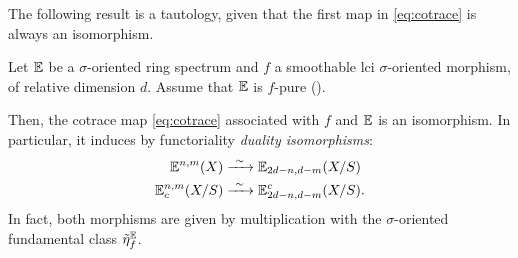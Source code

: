 The following result is a tautology, given that the first map
 in \eqref{eq:cotrace} is always an isomorphism.
\begin{prop}
Let $\mathbb E$ be  a $\sigma$-oriented ring spectrum
 and $f$ a smoothable lci $\sigma$-oriented morphism, of relative dimension $d$.
 Assume that $\mathbb E$ is $f$-pure ().

Then, the cotrace map \eqref{eq:cotrace} associated with $f$ and $\mathbb E$ is an isomorphism.
In particular, it induces by functoriality \emph{duality isomorphisms}:
\begin{align*}
\mathbb E^{n,m}(X) &\xrightarrow{\ \sim\ } \mathbb E_{2d-n,d-m}(X/S) \\
\mathbb E^{n,m}_c(X/S) &\xrightarrow{\ \sim\ } \mathbb E^c_{2d-n,d-m}(X/S).
\end{align*}
In fact, both morphisms are given by multiplication with the $\sigma$-oriented fundamental class $\tilde \eta_f^\mathbb E$.
\end{prop}

